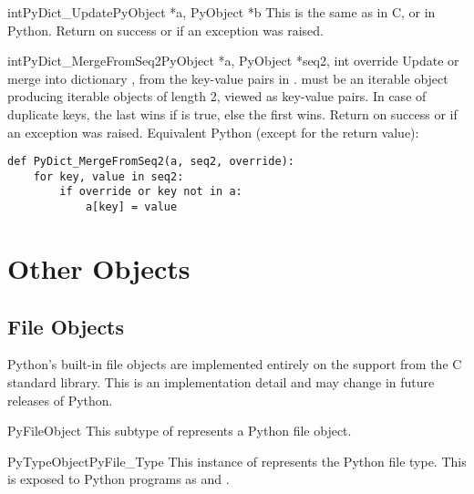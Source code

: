\begin{cfuncdesc}{int}{PyDict_Update}{PyObject *a, PyObject *b}
  This is the same as  in C,
  or  in Python.  Return  on
  success or  if an exception was raised.
\end{cfuncdesc}

\begin{cfuncdesc}{int}{PyDict_MergeFromSeq2}{PyObject *a, PyObject *seq2,
                                             int override}
  Update or merge into dictionary , from the key-value pairs in
  .   must be an iterable object producing
  iterable objects of length 2, viewed as key-value pairs.  In case of
  duplicate keys, the last wins if  is true, else the
  first wins.
  Return  on success or  if an exception
  was raised.
  Equivalent Python (except for the return value):

\begin{verbatim}
def PyDict_MergeFromSeq2(a, seq2, override):
    for key, value in seq2:
        if override or key not in a:
            a[key] = value
\end{verbatim}

\end{cfuncdesc}


\section{Other Objects \label{otherObjects}}

\subsection{File Objects \label{fileObjects}}

Python's built-in file objects are implemented entirely on the
 support from the C standard library.  This is an
implementation detail and may change in future releases of Python.

\begin{ctypedesc}{PyFileObject}
  This subtype of  represents a Python file object.
\end{ctypedesc}

\begin{cvardesc}{PyTypeObject}{PyFile_Type}
  This instance of  represents the Python file
  type.  This is exposed to Python programs as  and
  .
\end{cvardesc}


